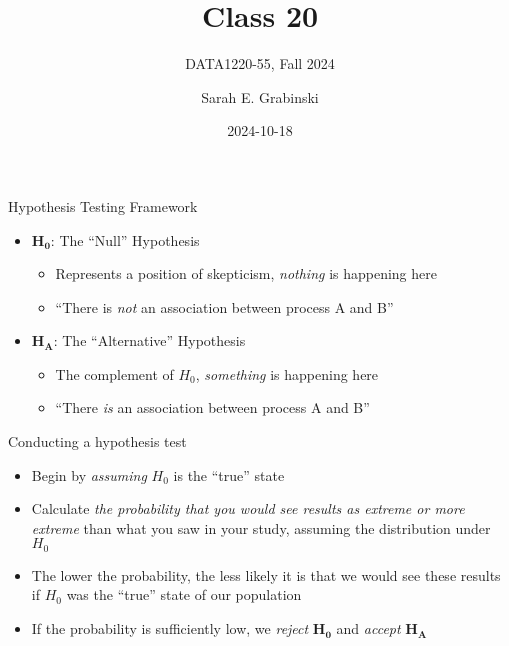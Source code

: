 \documentclass[
  ignorenonframetext,
]{beamer}
\title{Class 20}
\subtitle{DATA1220-55, Fall 2024}
\author{Sarah E. Grabinski}
\date{2024-10-18}
\providecommand{\tightlist}{%
  \setlength{\itemsep}{0pt}\setlength{\parskip}{0pt}}\usepackage{longtable,booktabs,array}
\begin{document}
\frame{\titlepage}


\begin{frame}{Hypothesis Testing Framework}
\label{hypothesis-testing-framework}
\begin{itemize}
\item
  \(\mathbf{H_0}\): The ``Null'' Hypothesis

  \begin{itemize}
  \item
    Represents a position of skepticism, \emph{nothing} is happening
    here
  \item
    ``There is \emph{not} an association between process A and B''
  \end{itemize}
\end{itemize}

\pause

\begin{itemize}
\item
  \(\mathbf{H_A}\): The ``Alternative'' Hypothesis

  \begin{itemize}
  \item
    The complement of \(H_0\), \emph{something} is happening here
  \item
    ``There \emph{is} an association between process A and B''
  \end{itemize}
\end{itemize}
\end{frame}

\begin{frame}{Conducting a hypothesis test}
\label{conducting-a-hypothesis-test}
\begin{itemize}
\tightlist
\item
  Begin by \emph{assuming} \(H_0\) is the ``true'' state
\end{itemize}

\pause

\begin{itemize}
\tightlist
\item
  Calculate \emph{the probability that you would see results as extreme
  or more extreme} than what you saw in your study, assuming the
  distribution under \(H_0\)
\end{itemize}

\pause

\begin{itemize}
\tightlist
\item
  The lower the probability, the less likely it is that we would see
  these results if \(H_0\) was the ``true'' state of our population
\end{itemize}

\pause

\begin{itemize}
\tightlist
\item
  If the probability is sufficiently low, we \emph{reject}
  \(\mathbf{H_0}\) and \emph{accept} \(\mathbf{H_A}\)
\end{itemize}
\end{frame}
\end{document}
